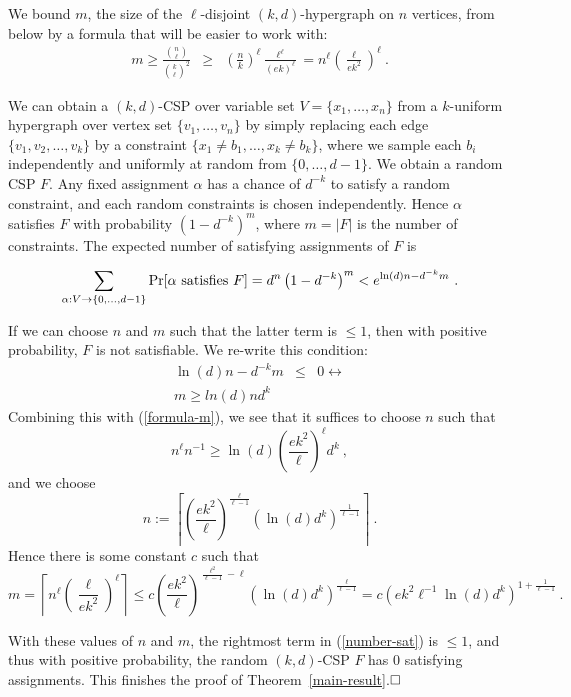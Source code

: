 \documentclass[envcountsect, envcountsame]{llncs}
\begin{document}
We bound $m$, the size of the $\ell$-disjoint $(k,d)$-hypergraph on
$n$ vertices, from below by a formula that will be easier to work with:
\begin{eqnarray}
  m \geq \frac{{n \choose \ell}}{{k \choose \ell}^2} & \geq &
  \left(\frac{n}{k}\right)^{\ell} \frac{\ell^\ell}{(ek)^\ell}
  = n^\ell \left(\frac{\ell}{ek^2}\right)^\ell \ .
\label{formula-m}
\end{eqnarray}

We can obtain a $(k,d)$-CSP over variable set $V=\{x_1,\dots,x_n\}$
from a $k$-uniform hypergraph over vertex set $\{v_1,\dots,v_n\}$ by
simply replacing each edge $\{v_1,v_2,\dots,v_k\}$ by a constraint
$\{x_1 \ne b_1, \dots, x_k \ne b_k\}$, where we sample each $b_i$
independently and uniformly at random from $\{0,\dots,d-1\}$. We
obtain a random CSP $F$. Any fixed assignment $\alpha$ has a chance of
$d^{-k}$ to satisfy a random constraint, and each random constraints
is chosen independently. Hence $\alpha$ satisfies $F$ with probability
$\left(1-d^{-k}\right)^m$, where $m=|F|$ is the number of constraints.
The expected number of satisfying assignments of $F$ is

\begin{eqnarray}
\sum_{\alpha:V \rightarrow \{0,\dots,d-1\}} \Pr[\alpha
\textnormal{ satisfies } F] = d^n \left(1-d^{-k}\right)^m
< e^{\ln(d)n - d^{-k}m} \ .
\label{number-sat}
\end{eqnarray}

If we can choose $n$ and $m$ such that the latter term is $\leq 1$,
then with positive probability, $F$ is not satisfiable. We re-write
this condition:
\begin{eqnarray*}
\ln(d)n - d^{-k}m & \leq & 0 \leftrightarrow \\
m \geq ln(d) n d^k
\end{eqnarray*}
Combining this with (\ref{formula-m}), we see that it suffices
to choose $n$ such that
$$
n^{\ell}n^{-1} \geq \ln(d) \left(\frac{ek^2}{\ell}\right)^\ell d^k \ ,
$$
and we choose
$$
n := \left\lceil \left(\frac{ek^2}{\ell}\right)^{\frac{\ell}{\ell-1}}
    \left(\ln(d)d^k\right)^{\frac{1}{\ell-1}} \right\rceil \ .
$$
Hence there is some constant $c$
such that
$$
m = \left\lceil n^\ell \left(\frac{\ell}{ek^2}\right)^\ell \right\rceil
\leq c \left(\frac{ek^2}{\ell}\right)^{\frac{\ell^2}{\ell-1}-\ell}
\left(\ln(d)d^k\right)^{\frac{\ell}{\ell-1}}  
= c\left(ek^2\ell^{-1}\ln(d)d^k\right)^{1+\frac{1}{\ell -1}} \ .
$$

With these values of $n$ and $m$, the rightmost term in
(\ref{number-sat}) is $\leq 1$, and thus with positive probability,
the random $(k,d)$-CSP $F$ has $0$ satisfying assignments.
This finishes the proof of Theorem~\ref{main-result}.$\hfill\Box$\\
\end{document}
